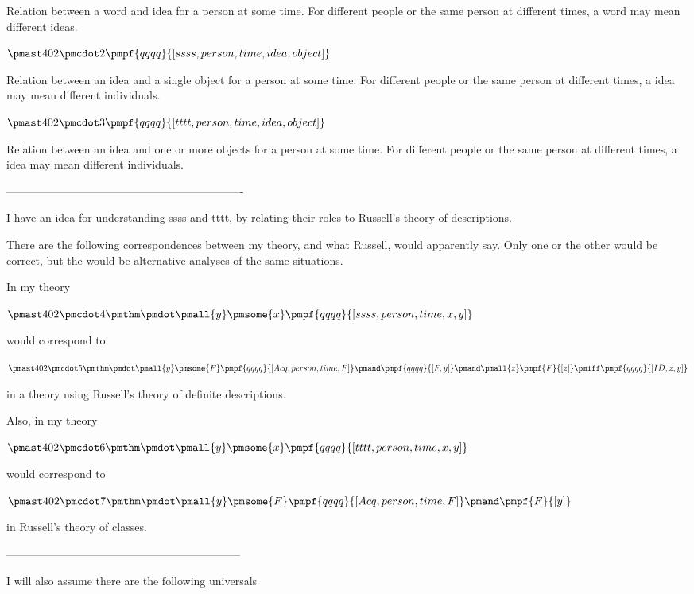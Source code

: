 \documentclass[12pt]{article}
\begin{document}
Relation between a word and idea for a person at some time.
For different people or the same person at different times, a word may mean different ideas.

$\pmast 402 \pmcdot 2 \pmpf{qqqq}{[ssss, person, time, idea, object]}$

Relation between an idea and a single object for a person at some time.
For different people or the same person at different times, a idea may mean different individuals.

$\pmast 402 \pmcdot 3 \pmpf{qqqq}{[tttt, person, time, idea, object]}$

Relation between an idea and one or more objects for a person at some time.
For different people or the same person at different times, a idea may mean different individuals.

----------------------------------------------------------------

I have an idea for understanding ssss and tttt, by relating their roles to Russell's theory of descriptions.

There are the following correspondences between my theory, and what Russell,
would apparently say. Only one or the other would be correct, but the would
be alternative analyses of the same situations.

In my theory

$\pmast 402 \pmcdot 4 \pmthm \pmdot \pmall{y} \pmsome{x} \pmpf{qqqq}{[ssss, person, time, x, y]} $

would correspond to 

$\pmast 402 \pmcdot 5 \pmthm \pmdot \pmall{y} \pmsome{F} \pmpf{qqqq}{[Acq, person,time,F]} \pmand \pmpf{qqqq}{[F, y]} \pmand \pmall{z} \pmpf{F}{[z]} \pmiff \pmpf{qqqq}{[ID,z,y]} $

in a theory using Russell's theory of definite descriptions.

Also, in my theory

$\pmast 402 \pmcdot 6 \pmthm \pmdot \pmall{y} \pmsome{x} \pmpf{qqqq}{[tttt, person, time, x, y]} $

would correspond to

$\pmast 402 \pmcdot 7 \pmthm \pmdot \pmall{y} \pmsome{F} \pmpf{qqqq}{[Acq, person,time,F]} \pmand \pmpf{F}{[y]} $

in Russell's theory of classes.

---------------------------------------------------------------

I will also assume there are the following universals
\end{document}
